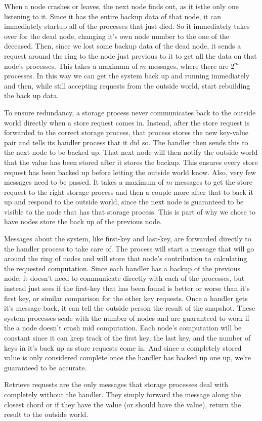 \documentclass[12pt,letterpaper]{article}
\begin{document}
When a node crashes or leaves, the next node finds out, as it isthe only one listening to it. Since it has the entire backup data of that node, it can immediately startup all of the processes that just died. So it immediately takes over for the dead node, changing it's own node number to the one of the deceased. Then, since we lost some backup data of the dead node, it sends a request around the ring to the node just previous to it to get all the data on that node's processes. This takes a maximum of $m$ messages, where there are $2^m$ processes. In this way we can get the system back up and running immediately and then, while still accepting requests from the outside world, start rebuilding the back up data.

To ensure redundancy, a storage process never communicates back to the outside world directly when a store request comes in. Instead, after the store request is forwarded to the correct storage process, that process stores the new key-value pair and tells its handler process that it did so. The handler then sends this to the next node to be backed up. That next node will then notify the outside world that the value has been stored after it stores the backup. This ensures every store request has been backed up before letting the outside world know. Also, very few messages need to be passed. It takes a maximum of $m$ messages to get the store request to the right storage process and then a couple more after that to back it up and respond to the outside world, since the next node is guaranteed to be visible to the node that has that storage process. This is part of why we chose to have nodes store the back up of the previous node.

Messages about the system, like first-key and last-key, are forwarded directly to the handler process to take care of. The process will start a message that will go around the ring of nodes and will store that node's contribution to calculating the requested computation. Since each handler has a backup of the previous node, it doesn't need to communicate directly with each of the processes, but instead just sees if the first-key that has been found is better or worse than it's first key, or similar comparison for the other key requests. Once a handler gets it's message back, it can tell the outside person the result of the snapshot. These system processes scale with the number of nodes and are guaranteed to work if the a node doesn't crash mid computation. Each node's computation will be constant since it can keep track of the first key, the last key, and the number of keys in it's back up as store requests come in. And since a completely stored value is only considered complete once the handler has backed up one up, we're guaranteed to be accurate.

Retrieve requests are the only messages that storage processes deal with completely without the handler. They simply forward the message along the closest chord or if they have the value (or should have the value), return the result to the outside world.
\end{document}
